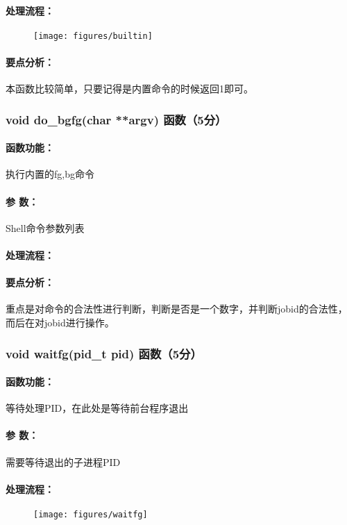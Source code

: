 \paragraph{处理流程：}
\begin{figure}[H]
  \centering 
  \texttt{[image: figures/builtin]}
\end{figure}
\paragraph{要点分析：}本函数比较简单，只要记得是内置命令的时候返回1即可。

\subsubsection{void do\_bgfg(char **argv) 函数（5分）}

\paragraph{函数功能：}执行内置的fg,bg命令
\paragraph{参   数：}Shell命令参数列表
\paragraph{处理流程：}
\paragraph{要点分析：}重点是对命令的合法性进行判断，判断是否是一个数字，并判断jobid的合法性，而后在对jobid进行操作。

\subsubsection{void waitfg(pid\_t pid) 函数（5分）}

\paragraph{函数功能：}等待处理PID，在此处是等待前台程序退出
\paragraph{参   数：}需要等待退出的子进程PID
\paragraph{处理流程：}
\begin{figure}[H]
    \centering 
    \texttt{[image: figures/waitfg]}
\end{figure}
